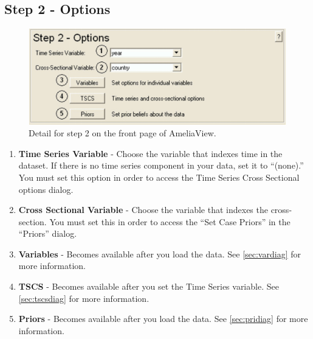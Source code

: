 \documentclass[12pt,titlepage]{article}
\begin{document}
\subsection{Step 2 - Options}
\label{sec:step2}
\begin{figure}[ht]
  \centering \includegraphics[scale=.75]{step2}
  \caption{Detail for step 2 on the front page of AmeliaView.}
\end{figure}
\begin{enumerate}
\item \textbf{Time Series Variable} - Choose the variable that indexes
  time in the dataset.  If there is no time series component in your
  data, set it to ``(none).''  You must set this option in order to
  access the Time Series Cross Sectional options dialog.
\item \textbf{Cross Sectional Variable} - Choose the variable that
  indexes the cross-section.  You must set this in order to access the
  ``Set Case Priors'' in the ``Priors'' dialog.
\item \textbf{Variables} - Becomes available after you load the data.
  See \ref{sec:vardiag} for more information.
\item \textbf{TSCS} - Becomes available after you set the Time Series
  variable.  See \ref{sec:tscsdiag} for more information.
\item \textbf{Priors} - Becomes available after you load the data.
  See \ref{sec:pridiag} for more information.
\end{enumerate}
\end{document}
